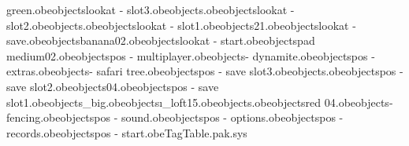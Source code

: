 green.obe objects\camera lookat - slot3.obe objects\savetoslot.obe objects\camera lookat - slot2.obe objects\starttoaudiotwo.obe objects\camera lookat - slot1.obe objects\line21.obe objects\camera lookat - save.obe objects\food banana02.obe objects\camera lookat - start.obe objects\lily pad medium02.obe objects\camera pos - multiplayer.obe objects\bank - dynamite.obe objects\camera pos - extras.obe objects\bank - safari tree.obe objects\camera pos - save slot3.obe objects\starttoextrastwo.obe objects\camera pos - save slot2.obe objects\box04.obe objects\camera pos - save slot1.obe objects\branch_big.obe objects\i_loft15.obe objects\starttosavetwo.obe objects\bush red 04.obe objects\bank - fencing.obe objects\camera pos - sound.obe objects\camera pos - options.obe objects\camera pos - records.obe objects\camera pos - start.obe TagTable.pak.sys 